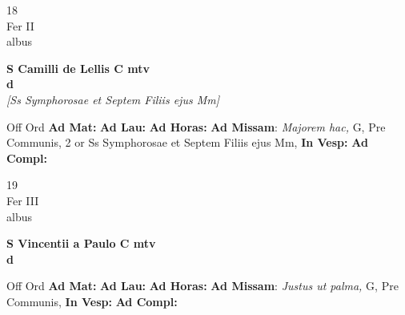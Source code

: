 \documentclass[10pt, openany]{book}
\begin{document}
        \begin{center}
            \begin{minipage}{3.5in}
                \vspace{2em}
                \begin{minipage}{0.5in}
                    {\Huge 18} \\
                    {\normalsize Fer II} \\
                    {\normalsize albus}
                \end{minipage}
                \begin{minipage}{3.0in}
                    \textbf{ \large S Camilli de Lellis C mtv \\
                    \textnormal{\normalsize d}} \\ \textit{[Ss Symphorosae et Septem Filiis ejus Mm]} \\ 
                \end{minipage}
                \begin{justify}Off Ord
                    \textbf{Ad Mat: }
                    \textbf{Ad Lau: }
                    \textbf{Ad Horas: }\textbf{Ad Missam}: \textit{Majorem hac,} G, Pre Communis, 2 or Ss Symphorosae et Septem Filiis ejus Mm,  
                    \textbf{In Vesp: }
                    \textbf{Ad Compl: }
                \end{justify}
            \end{minipage}
        \end{center}
    
        \begin{center}
            \begin{minipage}{3.5in}
                \vspace{2em}
                \begin{minipage}{0.5in}
                    {\Huge 19} \\
                    {\normalsize Fer III} \\
                    {\normalsize albus}
                \end{minipage}
                \begin{minipage}{3.0in}
                    \textbf{ \large S Vincentii a Paulo C mtv \\
                    \textnormal{\normalsize d}} \\ 
                \end{minipage}
                \begin{justify}Off Ord
                    \textbf{Ad Mat: }
                    \textbf{Ad Lau: }
                    \textbf{Ad Horas: }\textbf{Ad Missam}: \textit{Justus ut palma,} G, Pre Communis,  
                    \textbf{In Vesp: }
                    \textbf{Ad Compl: }
                \end{justify}
            \end{minipage}
        \end{center}
    
\end{document}
